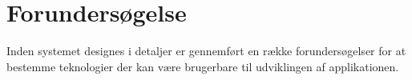 \chapter{Forundersøgelse}
Inden systemet designes i detaljer er gennemført en række forundersøgelser for at bestemme teknologier der kan være brugerbare til udviklingen af applikationen.





